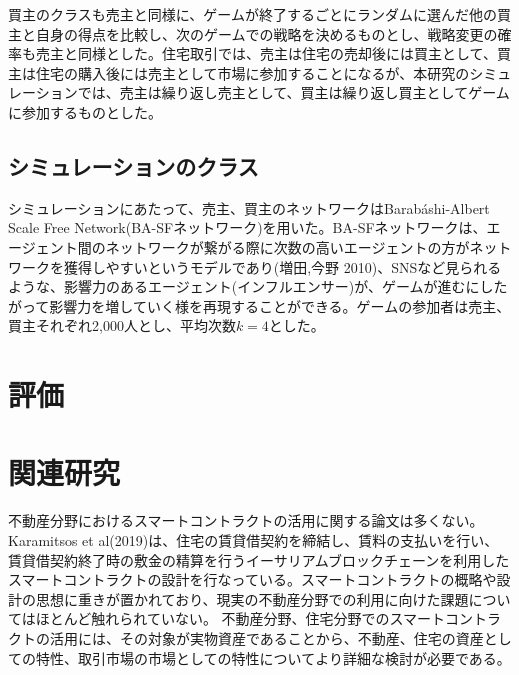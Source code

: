 \documentclass[a4paper,fontsize=11pt,report,notitlepage,line_length=38zw,number_of_lines=40,dvipdfmx]{jlreq}
\begin{document}
買主のクラスも売主と同様に、ゲームが終了するごとにランダムに選んだ他の買主と自身の得点を比較し、次のゲームでの戦略を決めるものとし、戦略変更の確率も売主と同様とした。住宅取引では、売主は住宅の売却後には買主として、買主は住宅の購入後には売主として市場に参加することになるが、本研究のシミュレーションでは、売主は繰り返し売主として、買主は繰り返し買主としてゲームに参加するものとした。

\section{シミュレーションのクラス}
シミュレーションにあたって、売主、買主のネットワークはBarab\'{a}shi-Albert Scale Free Network(BA-SFネットワーク)を用いた。BA-SFネットワークは、エージェント間のネットワークが繋がる際に次数の高いエージェントの方がネットワークを獲得しやすいというモデルであり(増田,今野 2010)\cite{masuda2010}、SNSなど見られるような、影響力のあるエージェント(インフルエンサー)が、ゲームが進むにしたがって影響力を増していく様を再現することができる。ゲームの参加者は売主、買主それぞれ2,000人とし、平均次数$k=4$とした。

\chapter{評価}


\chapter{関連研究}
不動産分野におけるスマートコントラクトの活用に関する論文は多くない。Karamitsos et al(2019)\cite{karamitsos2019}は、住宅の賃貸借契約を締結し、賃料の支払いを行い、賃貸借契約終了時の敷金の精算を行うイーサリアムブロックチェーンを利用したスマートコントラクトの設計を行なっている。スマートコントラクトの概略や設計の思想に重きが置かれており、現実の不動産分野での利用に向けた課題についてはほとんど触れられていない。
不動産分野、住宅分野でのスマートコントラクトの活用には、その対象が実物資産であることから、不動産、住宅の資産としての特性、取引市場の市場としての特性についてより詳細な検討が必要である。
\end{document}
